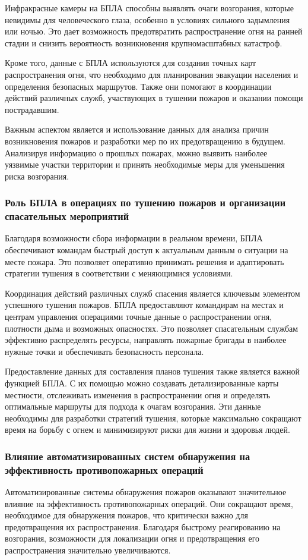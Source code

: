 Инфракрасные камеры на БПЛА способны выявлять очаги возгорания, которые невидимы для человеческого глаза, особенно в условиях сильного задымления или ночью. Это дает возможность предотвратить распространение огня на ранней стадии и снизить вероятность возникновения крупномасштабных катастроф.

Кроме того, данные с БПЛА используются для создания точных карт распространения огня, что необходимо для планирования эвакуации населения и определения безопасных маршрутов. Также они помогают в координации действий различных служб, участвующих в тушении пожаров и оказании помощи пострадавшим.

Важным аспектом является и использование данных для анализа причин возникновения пожаров и разработки мер по их предотвращению в будущем. Анализируя информацию о прошлых пожарах, можно выявить наиболее уязвимые участки территории и принять необходимые меры для уменьшения риска возгорания.
\subsubsection{Роль БПЛА в операциях по тушению пожаров и организации спасательных мероприятий}
Благодаря возможности сбора информации в реальном времени, БПЛА обеспечивают командам быстрый доступ к актуальным данным о ситуации на месте пожара. Это позволяет оперативно принимать решения и адаптировать стратегии тушения в соответствии с меняющимися условиями.

Координация действий различных служб спасения является ключевым элементом успешного тушения пожаров. БПЛА предоставляют командирам на местах и центрам управления операциями точные данные о распространении огня, плотности дыма и возможных опасностях. Это позволяет спасательным службам эффективно распределять ресурсы, направлять пожарные бригады в наиболее нужные точки и обеспечивать безопасность персонала.

Предоставление данных для составления планов тушения также является важной функцией БПЛА. С их помощью можно создавать детализированные карты местности, отслеживать изменения в распространении огня и определять оптимальные маршруты для подхода к очагам возгорания. Эти данные необходимы для разработки стратегий тушения, которые максимально сокращают время на борьбу с огнем и минимизируют риски для жизни и здоровья людей.
\subsubsection{Влияние автоматизированных систем обнаружения на эффективность противопожарных операций}
Автоматизированные системы обнаружения пожаров оказывают значительное влияние на эффективность противопожарных операций. Они сокращают время, необходимое для обнаружения пожаров, что критически важно для предотвращения их распространения. Благодаря быстрому реагированию на возгорания, возможности для локализации огня и предотвращения его распространения значительно увеличиваются.

